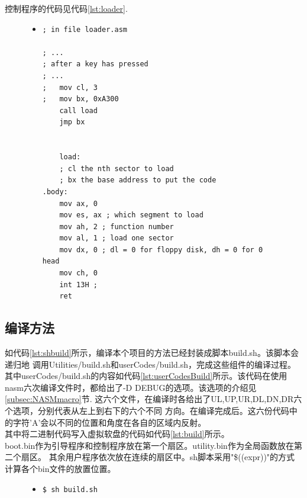 \documentclass[a4paper]{article}
\begin{document}
    控制程序的代码见代码\ref{lst:loader}.

    \begin{figure}
    \begin{itemize}
    \item[] \begin{lstlisting}[language={[x86masm]Assembler}, label=lst:loader, caption=控制程序中的扇区载入部分]
; in file loader.asm

; ...
; after a key has pressed
; ...
;   mov cl, 3
;   mov bx, 0xA300
    call load
    jmp bx


    load:
    ; cl the nth sector to load
    ; bx the base address to put the code
.body:
    mov ax, 0
    mov es, ax ; which segment to load
    mov ah, 2 ; function number
    mov al, 1 ; load one sector
    mov dx, 0 ; dl = 0 for floppy disk, dh = 0 for 0 head
    mov ch, 0 
    int 13H ;
    ret 
    \end{lstlisting}
    \end{itemize}
    \end{figure}

    \subsection{编译方法} \label{sec:compile}
    如代码\ref{lst:shbuild}所示，编译本个项目的方法已经封装成脚本build.sh。该脚本会递归地
    调用Utilities/build.sh和userCodes/build.sh，完成这些组件的编译过程。\\ 

    其中userCodes/build.sh的内容如代码\ref{lst:userCodesBuild}所示。该代码在使用
    nasm六次编译文件时，都给出了-D DEBUG的选项。该选项的介绍见\ref{subsec:NASMmacro}节.
    这六个文件，在编译时各给出了UL,UP,UR,DL,DN,DR六个选项，分别代表从左上到右下的六个不同
    方向。在编译完成后。这六份代码中的字符'A'会以不同的位置和角度在各自的区域内反射。\\ 

    其中将二进制代码写入虚拟软盘的代码如代码\ref{lst:build}所示。\\
    boot.bin作为引导程序和控制程序放在第一个扇区。utility.bin作为全局函数放在第二个扇区。
    其余用户程序依次放在连续的扇区中。sh脚本采用"\$((expr))"的方式计算各个bin文件的放置位置。

    \begin{figure}
    \begin{itemize}
    \item[] \begin{lstlisting}[language=sh, label=lst:shbuild, caption=编译程序代码的方法]
$ sh build.sh
    \end{lstlisting}
    \end{itemize}
    \end{figure}
\end{document}
